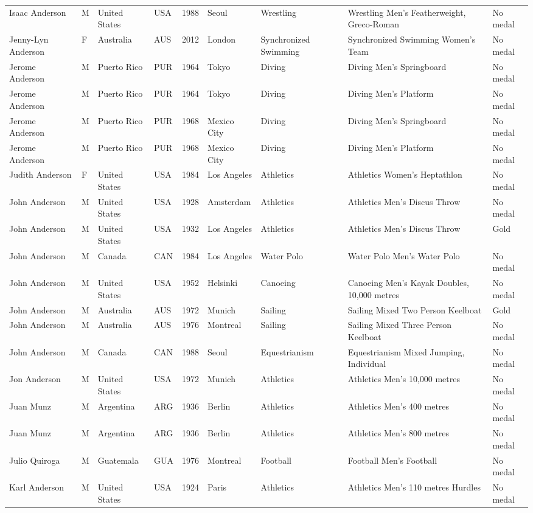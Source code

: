 \documentclass{article}%
\begin{document}
\begin{longtable}{l l l l l l l l l}
Isaac Anderson&M&United States&USA&1988&Seoul&Wrestling&Wrestling Men's Featherweight, Greco{-}Roman&No medal\\%
Jenny{-}Lyn Anderson&F&Australia&AUS&2012&London&Synchronized Swimming&Synchronized Swimming Women's Team&No medal\\%
Jerome Anderson&M&Puerto Rico&PUR&1964&Tokyo&Diving&Diving Men's Springboard&No medal\\%
Jerome Anderson&M&Puerto Rico&PUR&1964&Tokyo&Diving&Diving Men's Platform&No medal\\%
Jerome Anderson&M&Puerto Rico&PUR&1968&Mexico City&Diving&Diving Men's Springboard&No medal\\%
Jerome Anderson&M&Puerto Rico&PUR&1968&Mexico City&Diving&Diving Men's Platform&No medal\\%
Judith Anderson&F&United States&USA&1984&Los Angeles&Athletics&Athletics Women's Heptathlon&No medal\\%
John Anderson&M&United States&USA&1928&Amsterdam&Athletics&Athletics Men's Discus Throw&No medal\\%
John Anderson&M&United States&USA&1932&Los Angeles&Athletics&Athletics Men's Discus Throw&Gold\\%
John Anderson&M&Canada&CAN&1984&Los Angeles&Water Polo&Water Polo Men's Water Polo&No medal\\%
John Anderson&M&United States&USA&1952&Helsinki&Canoeing&Canoeing Men's Kayak Doubles, 10,000 metres&No medal\\%
John Anderson&M&Australia&AUS&1972&Munich&Sailing&Sailing Mixed Two Person Keelboat&Gold\\%
John Anderson&M&Australia&AUS&1976&Montreal&Sailing&Sailing Mixed Three Person Keelboat&No medal\\%
John Anderson&M&Canada&CAN&1988&Seoul&Equestrianism&Equestrianism Mixed Jumping, Individual&No medal\\%
Jon Anderson&M&United States&USA&1972&Munich&Athletics&Athletics Men's 10,000 metres&No medal\\%
Juan Munz&M&Argentina&ARG&1936&Berlin&Athletics&Athletics Men's 400 metres&No medal\\%
Juan Munz&M&Argentina&ARG&1936&Berlin&Athletics&Athletics Men's 800 metres&No medal\\%
Julio Quiroga&M&Guatemala&GUA&1976&Montreal&Football&Football Men's Football&No medal\\%
Karl Anderson&M&United States&USA&1924&Paris&Athletics&Athletics Men's 110 metres Hurdles&No medal\\%

\end{longtable}
\end{document}
